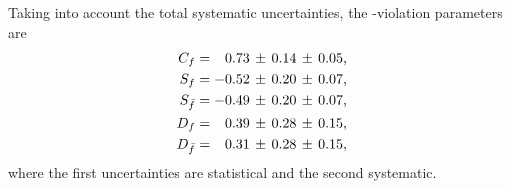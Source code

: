 Taking into account the total systematic uncertainties, the \CP-violation parameters are
%
\begin{align} \label{eqn:BsDsK_TD_Results}
    \Cpar  &= \n0.73\,\pm\,0.14\,\pm\,0.05 \rlap{,} \\
    \Spar  &=  -0.52\,\pm\,0.20\,\pm\,0.07 \rlap{,} \\
    \Sbpar &=  -0.49\,\pm\,0.20\,\pm\,0.07 \rlap{,} \\
    \Dpar  &= \n0.39\,\pm\,0.28\,\pm\,0.15 \rlap{,} \\
    \Dbpar &= \n0.31\,\pm\,0.28\,\pm\,0.15 \rlap{,}
\end{align}
%
where the first uncertainties are statistical and the second systematic.

